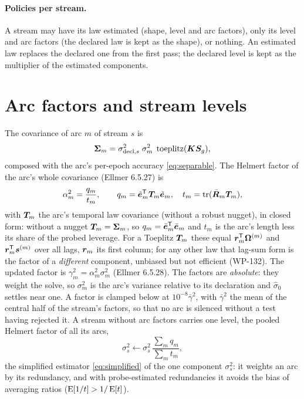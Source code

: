 \paragraph{Policies per stream.} A stream may have its law estimated (shape, level and arc
factors), only its level and arc factors (the declared law is kept as the shape), or nothing. An
estimated law replaces the declared one from the first pass; the declared level is kept as the
multiplier of the estimated components.

\section{Arc factors and stream levels}\label{sec:arcfactors}

The covariance of arc $m$ of stream $s$ is
\begin{equation}\label{eq:arccov}
\bm{\Sigma}_m=\sigma_{\mathrm{decl},s}^2\;\sigma_m^2\;\operatorname{toeplitz}(\bm{K}\bm{S}_g),
\end{equation}
composed with the arc's per-epoch accuracy \eqref{eq:separable}. The Helmert factor of the arc's
whole covariance (Ellmer 6.5.27) is
\begin{equation}
\alpha_m^2=\frac{q_m}{t_m},\qquad q_m=\tilde{\bm{e}}_m^{\mathsf T}\bm{T}_m\tilde{\bm{e}}_m,\quad
t_m=\operatorname{tr}(\bar{\bm{R}}_m\bm{T}_m),
\end{equation}
with $\bm{T}_m$ the arc's temporal law covariance (without a robust nugget), in closed form:
without a nugget $\bm{T}_m=\bm{\Sigma}_m$, so $q_m=\bar{\bm{e}}_m^{\mathsf T}\bar{\bm{e}}_m$ and $t_m$ is the arc's
length less its share of the probed leverage. For a Toeplitz $\bm{T}_m$ these equal
$\bm{r}_m^{\mathsf T}\bm{\Omega}^{(m)}$ and $\bm{r}_m^{\mathsf T}\bm{s}^{(m)}$ over all lags, $\bm{r}_m$ its first column; for
any other law that lag-sum form is the factor of a \emph{different} component, unbiased but not
efficient (WP-132). The updated factor is
$\gamma_m^2=\alpha_m^2\sigma_m^2$ (Ellmer 6.5.28). The factors are \emph{absolute}: they weight the
solve, so $\sigma_m^2$ is the arc's variance relative to its declaration and $\hat\sigma_0$ settles
near one. A factor is clamped below at $10^{-8}\bar\gamma^2$, with $\bar\gamma^2$ the mean of the
central half of the stream's factors, so that no arc is silenced without a test having rejected it.
A stream without arc factors carries one level, the pooled Helmert factor of all its arcs,
\begin{equation}\label{eq:pooledlevel}
\sigma_s^2\leftarrow\sigma_s^2\,\frac{\sum_mq_m}{\sum_mt_m},
\end{equation}
the simplified estimator \eqref{eq:simplified} of the one component $\sigma_s^2$: it weights an arc
by its redundancy, and with probe-estimated redundancies it avoids the bias of averaging ratios
($\operatorname{E}[1/t]>1/\operatorname{E}[t]$).

